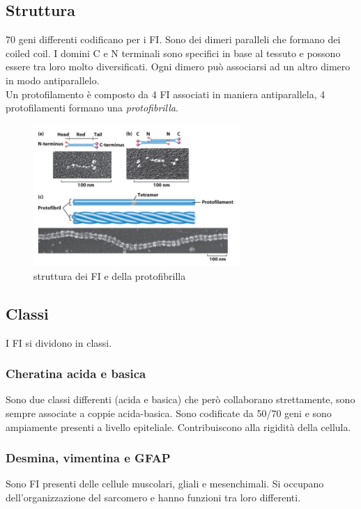     \subsection{Struttura}
        70 geni differenti codificano per i FI. Sono dei dimeri paralleli che formano dei coiled coil. I domini C e N terminali sono specifici in base al tessuto e possono essere tra loro molto diversificati. Ogni dimero può associarsi ad un altro dimero in modo antiparallelo.\\
        Un protofilamento è composto da 4 FI associati in maniera antiparallela, 4 protofilamenti formano una \textit{protofibrilla}.
        \begin{figure}[h]
            \centering
            \includegraphics[width=0.7\textwidth]{images/filametiIntermedi.JPG}
            \caption{\small struttura dei FI e della protofibrilla}
            \label{fig:mesh1}
        \end{figure}
    \subsection{Classi}
        I FI si dividono in classi.
        \subsubsection{Cheratina acida e basica}
            Sono due classi differenti (acida e basica) che però collaborano strettamente, sono sempre associate a coppie acida-basica. Sono codificate da 50/70 geni e sono ampiamente presenti a livello epiteliale. Contribuiscono alla rigidità della cellula.
        \subsubsection{Desmina, vimentina e GFAP}
            Sono FI presenti delle cellule muscolari, gliali e mesenchimali. Si occupano dell'organizzazione del sarcomero e hanno funzioni tra loro differenti.
